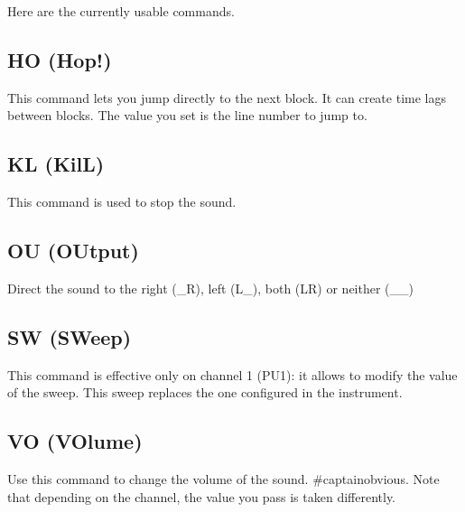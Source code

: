 
Here are the currently usable commands.

\subsection{HO (Hop!)}

This command lets you jump directly to the next block.
It can create time lags between blocks.
The value you set is the line number to jump to.

\subsection{KL (KilL)}

This command is used to stop the sound.


\subsection{OU (OUtput)}

Direct the sound to the right (\_R), left (L\_), both (LR) or neither (\_\_)

\subsection{SW (SWeep)}

This command is effective only on channel 1 (PU1): it allows to modify the value of the sweep.
This sweep replaces the one configured in the instrument.

\subsection{VO (VOlume)}

Use this command to change the volume of the sound.
\#captainobvious.
Note that depending on the channel, the value you pass is taken differently.
